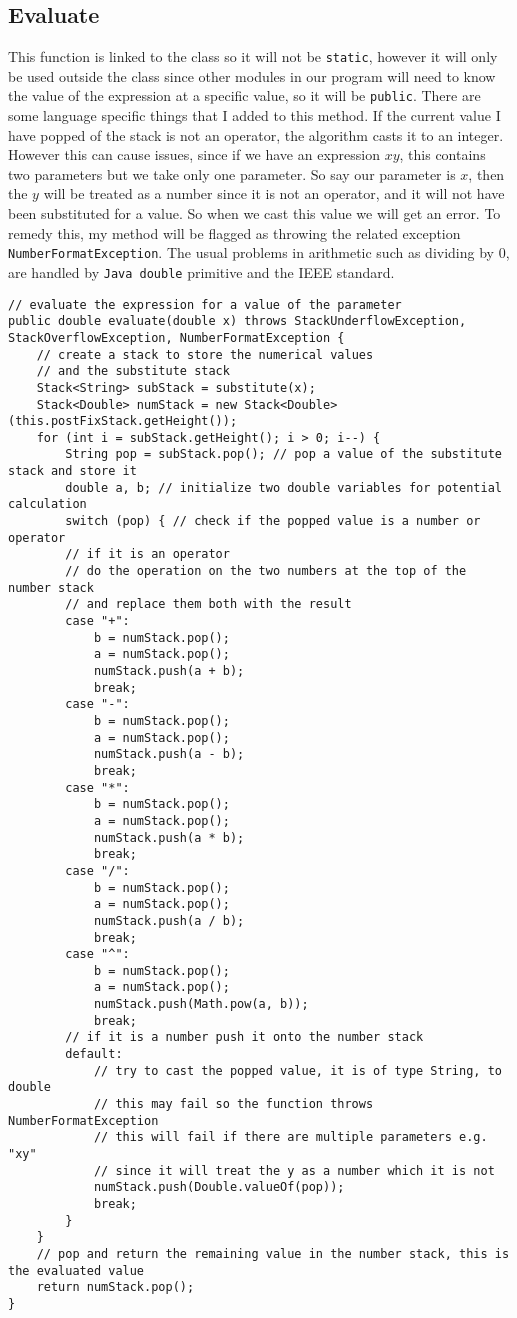 \documentclass[../../../../../main.tex]{subfiles}
\begin{document}
\subsection{Evaluate}
This function is linked to the class so it will not be \texttt{static}, however it will only be used outside the class since other modules in our program will need to know the value of the expression at a specific value, so it will be \texttt{public}. There are some language specific things that I added to this method. If the current value I have popped of the stack is not an operator, the algorithm casts it to an integer. However this can cause issues, since if we have an expression $xy$, this contains two parameters but we take only one parameter. So say our parameter is $x$, then the $y$ will be treated as a number since it is not an operator, and it will not have been substituted for a value. So when we cast this value we will get an error. To remedy this, my method will be flagged as throwing the related exception \texttt{NumberFormatException}. The usual problems in arithmetic such as dividing by 0, are handled by \texttt{Java double} primitive and the IEEE standard\cite{doubleJava, doubleIEEE}.
\begin{verbatim}
// evaluate the expression for a value of the parameter
public double evaluate(double x) throws StackUnderflowException, StackOverflowException, NumberFormatException {
	// create a stack to store the numerical values
	// and the substitute stack
	Stack<String> subStack = substitute(x);
	Stack<Double> numStack = new Stack<Double>(this.postFixStack.getHeight());
	for (int i = subStack.getHeight(); i > 0; i--) {
		String pop = subStack.pop(); // pop a value of the substitute stack and store it
		double a, b; // initialize two double variables for potential calculation
		switch (pop) { // check if the popped value is a number or operator
		// if it is an operator
		// do the operation on the two numbers at the top of the number stack
		// and replace them both with the result
		case "+":
			b = numStack.pop();
			a = numStack.pop();
			numStack.push(a + b);
			break;
		case "-":
			b = numStack.pop();
			a = numStack.pop();
			numStack.push(a - b);
			break;
		case "*":
			b = numStack.pop();
			a = numStack.pop();
			numStack.push(a * b);
			break;
		case "/":
			b = numStack.pop();
			a = numStack.pop();
			numStack.push(a / b);
			break;
		case "^":
			b = numStack.pop();
			a = numStack.pop();
			numStack.push(Math.pow(a, b));
			break;
		// if it is a number push it onto the number stack
		default:
			// try to cast the popped value, it is of type String, to double
			// this may fail so the function throws NumberFormatException
			// this will fail if there are multiple parameters e.g. "xy"
			// since it will treat the y as a number which it is not
			numStack.push(Double.valueOf(pop));
			break;
		}
	}
	// pop and return the remaining value in the number stack, this is the evaluated value
	return numStack.pop();
}
\end{verbatim}
\end{document}
